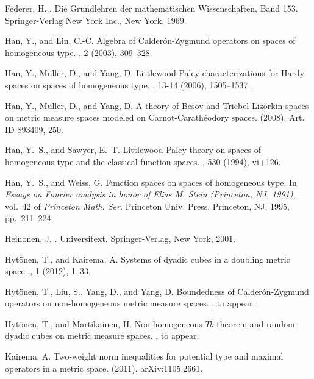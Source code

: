 \documentclass{amsart}
\numberwithin{equation}{section}
\theoremstyle{plain}
\theoremstyle{definition}
\theoremstyle{remark}
\begin{document}
{{{\begin{thebibliography}{10}
{\sc Federer, H.}
.
\newblock Die Grundlehren der mathematischen Wissenschaften, Band 153.
  Springer-Verlag New York Inc., New York, 1969.

{\sc Han, Y., and Lin, C.-C.}
\newblock Algebra of {C}alder\'on-{Z}ygmund operators on spaces of homogeneous
  type.
, 2 (2003), 309--328.

{\sc Han, Y., M{\"u}ller, D., and Yang, D.}
\newblock Littlewood-{P}aley characterizations for {H}ardy spaces on spaces of
  homogeneous type.
, 13-14 (2006), 1505--1537.

{\sc Han, Y., M{\"u}ller, D., and Yang, D.}
\newblock A theory of {B}esov and {T}riebel-{L}izorkin spaces on metric measure
  spaces modeled on {C}arnot-{C}arath\'eodory spaces.
 (2008), Art. ID 893409, 250.

{\sc Han, Y.~S., and Sawyer, E.~T.}
\newblock Littlewood-{P}aley theory on spaces of homogeneous type and the
  classical function spaces.
, 530 (1994), vi+126.

{\sc Han, Y.~S., and Weiss, G.}
\newblock Function spaces on spaces of homogeneous type.
\newblock In {\em Essays on {F}ourier analysis in honor of {E}lias {M}. {S}tein
  ({P}rinceton, {NJ}, 1991)}, vol.~42 of {\em Princeton Math. Ser.} Princeton
  Univ. Press, Princeton, NJ, 1995, pp.~211--224.

{\sc Heinonen, J.}
.
\newblock Universitext. Springer-Verlag, New York, 2001.

{\sc Hyt\"onen, T., and Kairema, A.}
\newblock Systems of dyadic cubes in a doubling metric space.
, 1 (2012), 1--33.   

{\sc Hyt\"onen, T., Liu, S., Yang, D., and Yang, D.}
\newblock Boundedness of {Calder\'on-Zygmund} operators on non-homogeneous
  metric measure spaces.
, to appear.

{\sc Hyt\"onen, T., and Martikainen, H.}
\newblock Non-homogeneous $Tb$ theorem and random dyadic cubes on metric
  measure spaces.
, to appear.

{\sc Kairema, A.}
\newblock Two-weight norm inequalities for potential type and maximal operators
  in a metric space.
 (2011).
\newblock arXiv:1105.2661.


\end{thebibliography}}}}
\end{document}
